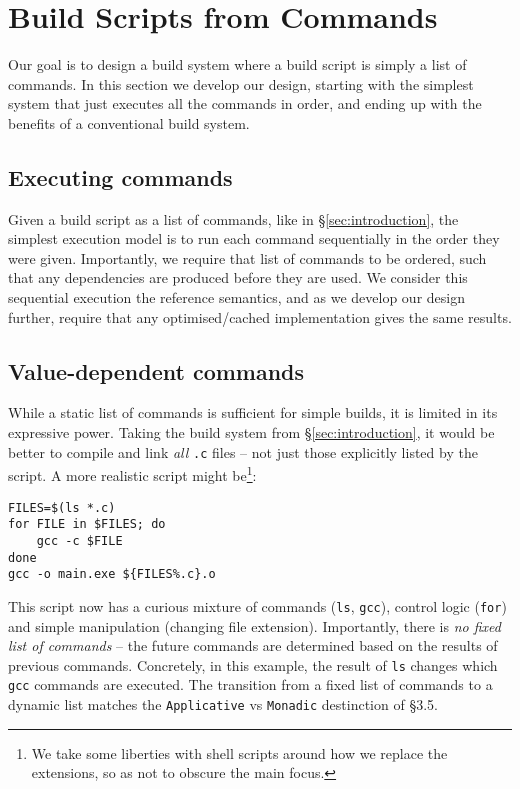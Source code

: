 \section{Build Scripts from Commands}
\label{sec:design}

Our goal is to design a build system where a build script is simply a list of commands. In this section we develop our design, starting with the simplest system that just executes all the commands in order, and ending up with the benefits of a conventional build system.

\subsection{Executing commands}
\label{sec:executing_commands}

Given a build script as a list of commands, like in \S\ref{sec:introduction}, the simplest execution model is to run each command sequentially in the order they were given. Importantly, we require that list of commands to be ordered, such that any dependencies are produced before they are used. We consider this sequential execution the reference semantics, and as we develop our design further, require that any optimised/cached implementation gives the same results.

\subsection{Value-dependent commands}
\label{sec:monadic}

While a static list of commands is sufficient for simple builds, it is limited in its expressive power. Taking the build system from \S\ref{sec:introduction}, it would be better to compile and link \emph{all} \texttt{.c} files -- not just those explicitly listed by the script. A more realistic script might be\footnote{We take some liberties with shell scripts around how we replace the extensions, so as not to obscure the main focus.}:

\vspace{3mm}
\begin{verbatim}
FILES=$(ls *.c)
for FILE in $FILES; do
    gcc -c $FILE
done
gcc -o main.exe ${FILES%.c}.o
\end{verbatim}
\vspace{3mm}

This script now has a curious mixture of commands (\texttt{ls}, \texttt{gcc}), control logic (\texttt{for}) and simple manipulation (changing file extension). Importantly, there is \emph{no fixed list of commands} -- the future commands are determined based on the results of previous commands. Concretely, in this example, the result of \texttt{ls} changes which \texttt{gcc} commands are executed. The transition from a fixed list of commands to a dynamic list matches the \texttt{Applicative} vs \texttt{Monadic} destinction of \citet{build_systems_a_la_carte} \S3.5.


